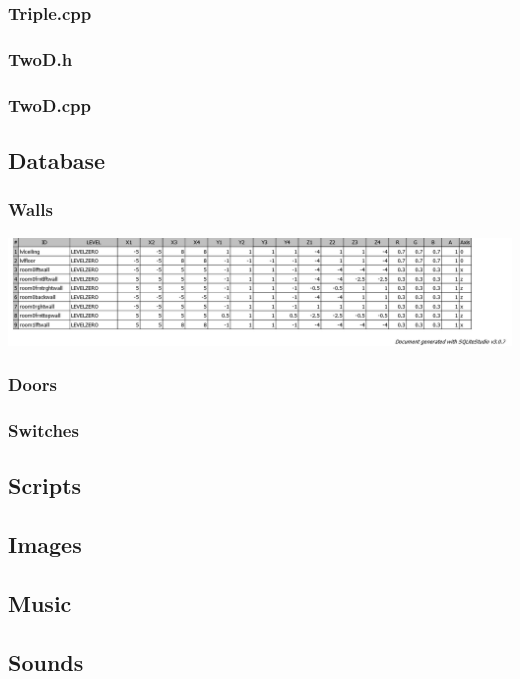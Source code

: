 \documentclass{article}
\begin{document}
\subsubsection{Triple.cpp}
	
	 				
\subsubsection{TwoD.h}
	

\subsubsection{TwoD.cpp}	
	

\subsection{Database}

\subsubsection{Walls}
	\includegraphics[width=18cm]{WALLS}

\subsubsection{Doors}

\subsubsection{Switches}
	 	 				
\subsection{Scripts}
 
\subsection{Images}
 
\subsection{Music}
	 	 	 				
\subsection{Sounds}
	 	 	 				
\end{document}
